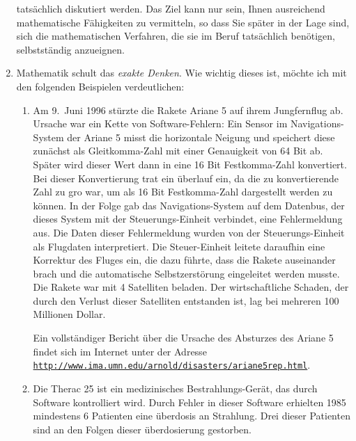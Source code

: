 \begin{enumerate}
      tats\"{a}chlich diskutiert werden.  Das Ziel kann nur sein, Ihnen ausreichend mathematische
      F\"{a}higkeiten zu vermitteln, so dass Sie sp\"{a}ter in der Lage sind, sich die
      mathematischen Verfahren, die sie  im Beruf tats\"{a}chlich ben\"{o}tigen, selbstst\"{a}ndig anzueignen.
\item Mathematik schult das \emph{exakte Denken}.  Wie wichtig dieses ist, m\"{o}chte ich mit den
      folgenden Beispielen verdeutlichen:  
      \begin{enumerate}
      \item Am 9.~Juni 1996 st\"{u}rzte die Rakete Ariane 5 auf ihrem Jungfernflug ab.
            Ursache war ein Kette von Software-Fehlern:  Ein Sensor im Navigations-System
            der Ariane 5 misst die horizontale Neigung und speichert diese zun\"{a}chst als Gleitkomma-Zahl
            mit einer Genauigkeit von 64 Bit ab.  Sp\"{a}ter wird dieser Wert dann in eine 
            16 Bit Festkomma-Zahl konvertiert.
            Bei dieser Konvertierung trat ein \"{u}berlauf ein, da die zu konvertierende Zahl
            zu gro\3 war, um als 16 Bit Festkomma-Zahl dargestellt werden zu k\"{o}nnen.
            In der Folge gab das Navigations-System auf dem Datenbus, der dieses System mit
            der Steuerungs-Einheit verbindet, eine Fehlermeldung aus.
            Die Daten dieser Fehlermeldung wurden von der Steuerungs-Einheit als Flugdaten 
            interpretiert.  Die Steuer-Einheit leitete daraufhin eine Korrektur des
            Fluges ein, die dazu f\"{u}hrte, dass die Rakete auseinander brach und die 
            automatische Selbstzerst\"{o}rung eingeleitet werden musste.
            Die Rakete war mit 4 Satelliten beladen. Der wirtschaftliche Schaden, der durch den Verlust dieser
            Satelliten entstanden ist, lag bei mehreren 100 Millionen Dollar.
            
            Ein vollst\"{a}ndiger Bericht \"{u}ber die Ursache des Absturzes des Ariane 5 findet sich
            im Internet unter der Adresse \\[0.2cm]
            \hspace*{1.3cm} 
            \href{http://www.ima.umn.edu/~arnold/disasters/ariane5rep.html}{\texttt{http://www.ima.umn.edu/arnold/disasters/ariane5rep.html}}.
      \item Die Therac 25 ist ein medizinisches Bestrahlungs-Ger\"{a}t, das durch 
            Software kontrolliert wird.  Durch  Fehler in dieser Software erhielten 1985
            mindestens 6 Patienten eine \"{u}berdosis an Strahlung.  Drei dieser Patienten sind an den
            Folgen dieser \"{u}berdosierung gestorben. 


\end{enumerate}
\end{enumerate}
